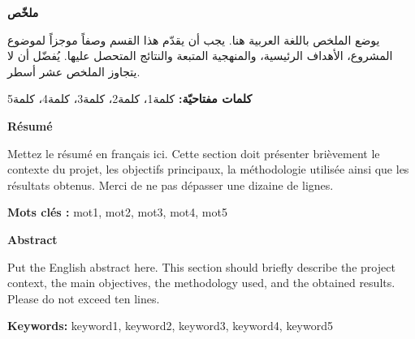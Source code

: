 
\thispagestyle{empty}

\begin{center}

\begin{minipage}{0.9\textwidth}


\begin{Arabic}

{\Large\textbf{ملخّص}}

\vspace{4mm}

يوضع الملخص باللغة العربية هنا. يجب أن يقدّم هذا القسم وصفاً موجزاً
لموضوع المشروع، الأهداف الرئيسية، والمنهجية المتبعة والنتائج
المتحصل عليها. يُفضّل أن لا يتجاوز الملخص عشر أسطر.

\vspace{4mm}

\textbf{كلمات مفتاحيّة:} كلمة1، كلمة2، كلمة3، كلمة4، كلمة5

\end{Arabic}

\vspace{10mm}


\begin{french}

{\Large\textbf{Résumé}}

\vspace{4mm}

Mettez le résumé en français ici. Cette section doit présenter
brièvement le contexte du projet, les objectifs principaux,
la méthodologie utilisée ainsi que les résultats obtenus.
Merci de ne pas dépasser une dizaine de lignes.

\vspace{4mm}

\textbf{Mots clés :} mot1, mot2, mot3, mot4, mot5

\end{french}

\vspace{10mm}


{\Large\textbf{Abstract}}

\vspace{4mm}

Put the English abstract here. This section should briefly describe
the project context, the main objectives, the methodology used,
and the obtained results. Please do not exceed ten lines.

\vspace{4mm}

\textbf{Keywords:} keyword1, keyword2, keyword3, keyword4, keyword5

\end{minipage}

\end{center}

\restoregeometry